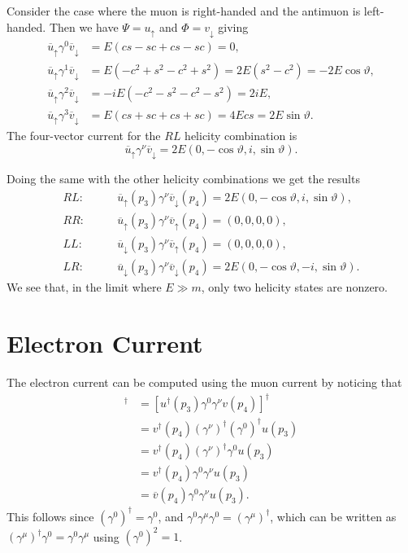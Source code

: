 \documentclass[fleqn]{NotesClass}
\newcommand{\hermit}{\dagger}
\newcommand{\diracadjoint}[1]{\overbar{#1}}
\begin{document}
    Consider the case where the muon is right-handed and the antimuon is left-handed.
    Then we have \(\Psi = u_{\uparrow}\) and \(\Phi = v_{\downarrow}\) giving
    \begin{align}
        \diracadjoint{u}_{\uparrow} \gamma^0 \diracadjoint{v}_{\downarrow} &= E(cs - sc + cs - sc) = 0,\\
        \diracadjoint{u}_{\uparrow} \gamma^1 \diracadjoint{v}_{\downarrow} &= E(-c^2 + s^2 - c^2 + s^2) = 2E(s^2 - c^2) = -2E\cos\vartheta,\\
        \diracadjoint{u}_{\uparrow} \gamma^2 \diracadjoint{v}_{\downarrow} &= -iE(-c^2 - s^2 - c^2 - s^2) = 2iE,\\
        \diracadjoint{u}_{\uparrow} \gamma^3 \diracadjoint{v}_{\downarrow} &= E(cs + sc + cs + sc) = 4Ecs = 2E\sin\vartheta.
    \end{align}
    The four-vector current for the \(RL\) helicity combination is
    \begin{equation}
        \diracadjoint{u}_{\uparrow} \gamma^\nu \diracadjoint{v}_{\downarrow} = 2E(0, -\cos\vartheta, i, \sin\vartheta).
    \end{equation}
    
    Doing the same with the other helicity combinations we get the results
    \begin{align}
        RL: \qquad &\diracadjoint{u}_{\uparrow}(p_3) \gamma^\nu \diracadjoint{v}_{\downarrow}(p_4) = 2E(0, -\cos\vartheta, i, \sin\vartheta),\\
        RR: \qquad &\diracadjoint{u}_{\uparrow}(p_3) \gamma^\nu \diracadjoint{v}_{\uparrow}(p_4) = (0, 0, 0, 0),\\
        LL: \qquad &\diracadjoint{u}_{\downarrow}(p_3) \gamma^\nu \diracadjoint{v}_{\uparrow}(p_4) = (0, 0, 0, 0),\\
        LR: \qquad &\diracadjoint{u}_{\downarrow}(p_3) \gamma^\nu \diracadjoint{v}_{\downarrow}(p_4) = 2E(0, -\cos\vartheta, -i, \sin\vartheta).
    \end{align}
    We see that, in the limit where \(E \gg m\), only two helicity states are nonzero.
    
    \section{Electron Current}
    The electron current can be computed using the muon current by noticing that
    \begin{align}
        [\diracadjoint{u}(p_3)\gamma^\nu v(p_4)]^\hermit &= [u^\hermit(p_3)\gamma^0\gamma^\nu v(p_4)]^\hermit\\
        &= v^\hermit(p_4) (\gamma^\nu)^\hermit (\gamma^0)^\hermit u(p_3)\\
        &= v^\hermit(p_4) (\gamma^\nu)^\hermit \gamma^0 u(p_3)\\
        &= v^\hermit(p_4) \gamma^0 \gamma^\nu u(p_3)\\
        &= \diracadjoint{v}(p_4) \gamma^0 \gamma^\nu u(p_3).
    \end{align}
    This follows since \((\gamma^0)^\hermit = \gamma^0\), and \(\gamma^0\gamma^\mu\gamma^0 = (\gamma^\mu)^\hermit\), which can be written as \((\gamma^\mu)^\hermit\gamma^0 = \gamma^0\gamma^\mu\) using \((\gamma^0)^2 = 1\).
    
\end{document}
